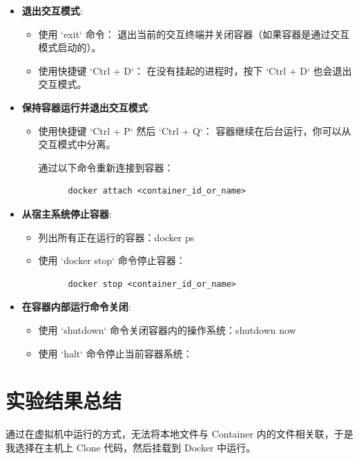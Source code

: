 \begin{itemize}
  \item \textbf{退出交互模式}:
  \begin{itemize}
      \item 使用 `exit` 命令：
      退出当前的交互终端并关闭容器（如果容器是通过交互模式启动的）。
      
      \item 使用快捷键 `Ctrl + D`：
      在没有挂起的进程时，按下 `Ctrl + D` 也会退出交互模式。
  \end{itemize}

  \item \textbf{保持容器运行并退出交互模式}:
  \begin{itemize}
      \item 使用快捷键 `Ctrl + P` 然后 `Ctrl + Q`：
      容器继续在后台运行，你可以从交互模式中分离。
      
      通过以下命令重新连接到容器：
      \begin{verbatim}
      docker attach <container_id_or_name>
      \end{verbatim}
  \end{itemize}

  \item \textbf{从宿主系统停止容器}:
  \begin{itemize}
      \item 列出所有正在运行的容器：docker ps
      \item 使用 `docker stop` 命令停止容器：
      \begin{verbatim}
      docker stop <container_id_or_name>
      \end{verbatim}
  \end{itemize}

  \item \textbf{在容器内部运行命令关闭}:
  \begin{itemize}
      \item 使用 `shutdown` 命令关闭容器内的操作系统：shutdown now
      \item 使用 `halt` 命令停止当前容器系统：
  \end{itemize}
\end{itemize}

\section{实验结果总结}

通过在虚拟机中运行的方式，无法将本地文件与 Container 内的文件相关联，于是我选择在主机上 Clone 代码，然后挂载到 Docker 中运行。

